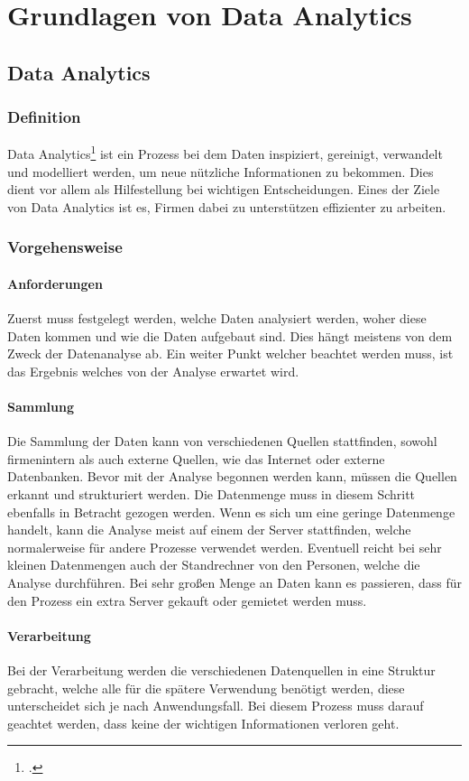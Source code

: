 \chapter{Grundlagen von Data Analytics}
\bauer	
\section{Data Analytics}	
\subsection{Definition}
Data Analytics\footcite{data-analysis} ist ein Prozess bei dem Daten inspiziert, gereinigt, verwandelt und modelliert werden, um neue nützliche Informationen zu bekommen. 
Dies dient vor allem als Hilfestellung bei wichtigen Entscheidungen. Eines der Ziele von Data Analytics ist es, Firmen dabei zu unterstützen effizienter zu arbeiten. 	
\subsection{Vorgehensweise}		
\subsubsection{Anforderungen}
Zuerst muss festgelegt werden, welche Daten analysiert werden, woher diese Daten kommen und wie die Daten aufgebaut sind. 
Dies hängt meistens von dem Zweck der Datenanalyse ab. Ein weiter Punkt welcher beachtet werden muss, ist das Ergebnis welches von der Analyse erwartet wird.		
\subsubsection{Sammlung}
Die Sammlung der Daten kann von verschiedenen Quellen stattfinden, sowohl firmenintern als auch externe Quellen, wie das Internet oder externe Datenbanken. 
Bevor mit der Analyse begonnen werden kann, müssen die Quellen erkannt und strukturiert werden. Die Datenmenge muss in diesem Schritt ebenfalls in Betracht gezogen werden. 
Wenn es sich um eine geringe Datenmenge handelt, kann die Analyse meist auf einem der Server stattfinden, welche normalerweise für andere Prozesse verwendet werden. 
Eventuell reicht bei sehr kleinen Datenmengen auch der Standrechner von den Personen, welche die Analyse durchführen. 
Bei sehr großen Menge an Daten kann es passieren, dass für den Prozess ein extra Server gekauft oder gemietet werden muss. 			
\newpage
\subsubsection{Verarbeitung}
Bei der Verarbeitung werden die verschiedenen Datenquellen in eine Struktur gebracht, welche alle für die spätere Verwendung benötigt werden, diese unterscheidet sich je nach Anwendungsfall. 
Bei diesem Prozess muss darauf geachtet werden, dass keine der wichtigen Informationen verloren geht. 		
